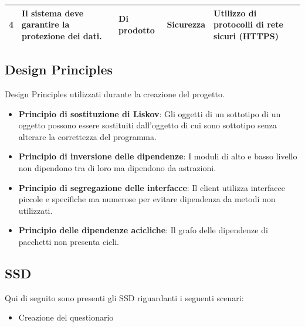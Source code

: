 \documentclass[12pt]{article}
\begin{document}
\begin{table}[H]
\begin{adjustbox}{max width=1.1\textwidth,center}
\begin{tabular}{lllll}
\multicolumn{1}{|l|}{4}                                                          & \multicolumn{1}{l|}{Il sistema deve garantire la protezione dei dati.}                   & \multicolumn{1}{l|}{Di prodotto}                                                  & \multicolumn{1}{l|}{Sicurezza}                                                      & \multicolumn{1}{l|}{Utilizzo di protocolli di rete sicuri (HTTPS)}                     \\ \hline
\end{tabular}
\endgroup
\end{adjustbox}
\end{table}


\subsection{Design Principles}
Design Principles utilizzati durante la creazione del progetto.
\begin{itemize}
	\item \textbf{Principio di sostituzione di Liskov}: Gli oggetti di un sottotipo di un oggetto possono essere sostituiti dall'oggetto di cui sono sottotipo senza alterare la correttezza del programma.
	\item \textbf{Principio di inversione delle dipendenze}: I moduli di alto e basso livello non dipendono tra di loro ma dipendono da astrazioni.
	\item \textbf{Principio di segregazione delle interfacce}: Il client utilizza interfacce piccole e specifiche ma numerose per evitare dipendenza da metodi non utilizzati.
	\item \textbf{Principio delle dipendenze acicliche}: Il grafo delle dipendenze di pacchetti non presenta cicli.
\end{itemize}

\subsection{SSD}
Qui di seguito sono presenti gli SSD riguardanti i seguenti scenari:
\begin{itemize}
\item Creazione del questionario
\end{itemize}
\end{document}

